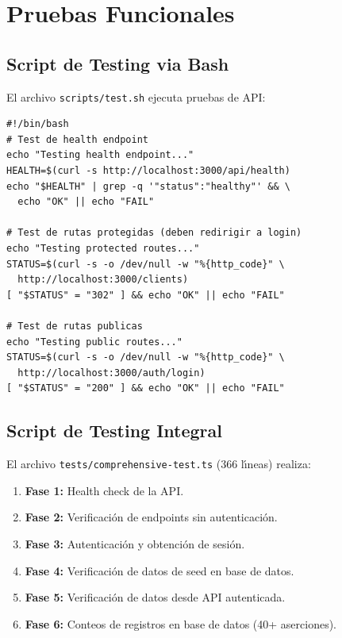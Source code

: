 \section{Pruebas Funcionales}

\subsection{Script de Testing via Bash}

El archivo \texttt{scripts/test.sh} ejecuta pruebas de API:

\begin{lstlisting}[style=bash, caption=test.sh - Pruebas funcionales de API]
#!/bin/bash
# Test de health endpoint
echo "Testing health endpoint..."
HEALTH=$(curl -s http://localhost:3000/api/health)
echo "$HEALTH" | grep -q '"status":"healthy"' && \
  echo "OK" || echo "FAIL"

# Test de rutas protegidas (deben redirigir a login)
echo "Testing protected routes..."
STATUS=$(curl -s -o /dev/null -w "%{http_code}" \
  http://localhost:3000/clients)
[ "$STATUS" = "302" ] && echo "OK" || echo "FAIL"

# Test de rutas publicas
echo "Testing public routes..."
STATUS=$(curl -s -o /dev/null -w "%{http_code}" \
  http://localhost:3000/auth/login)
[ "$STATUS" = "200" ] && echo "OK" || echo "FAIL"
\end{lstlisting}

\subsection{Script de Testing Integral}

El archivo \texttt{tests/comprehensive-test.ts} (366 l\'{\i}neas) realiza:

\begin{enumerate}
    \item \textbf{Fase 1:} Health check de la API.
    \item \textbf{Fase 2:} Verificaci\'on de endpoints sin autenticaci\'on.
    \item \textbf{Fase 3:} Autenticaci\'on y obtenci\'on de sesi\'on.
    \item \textbf{Fase 4:} Verificaci\'on de datos de seed en base de datos.
    \item \textbf{Fase 5:} Verificaci\'on de datos desde API autenticada.
    \item \textbf{Fase 6:} Conteos de registros en base de datos (40+
          aserciones).
\end{enumerate}

